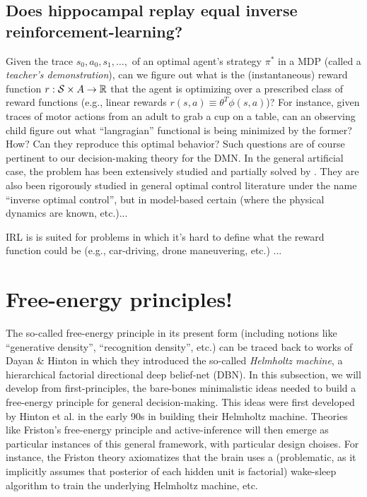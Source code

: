 \documentclass[10pt,letterpaper]{article}
\begin{document}
\subsection{Does hippocampal replay equal inverse reinforcement-learning?}
  Given the trace $s_0,a_0,s_1,\ldots,$ of an optimal agent's strategy $\pi^*$ in
  a MDP (called a \textit{teacher's demonstration}), can we figure out what is the
  (instantaneous) reward function $r: \mathcal S \times \mathcal \mathcal A
  \rightarrow \mathbb R$ that the agent is optimizing over a prescribed class of reward functions
  (e.g., linear rewards $r(s,a) \equiv \theta^T\phi(s,a)$)?
  For instance, given traces of motor actions from an adult to grab a cup on a table,
  can an observing child figure out what ``langragian'' functional is being minimized by the former?
  How? Can they reproduce this optimal behavior?
Such questions are of course pertinent to our decision-making theory for the DMN.
In the general artificial case, the problem has been extensively studied and partially solved by
\citep{abbeel2004}. They are also been rigorously studied in general optimal control literature under the name
``inverse optimal control'', but in model-based certain (where the physical dynamics are known, etc.)...

IRL is is suited for problems in which it's hard to define what the reward function could be
(e.g.,  car-driving, drone maneuvering, etc.) ...

\section{Free-energy principles!}
The so-called free-energy principle in its present form (including notions like ``generative density'', ``recognition density'', etc.) can be traced back to works of Dayan \& Hinton \citep{dayan1995helmholtz} in which they introduced the so-called \textit{Helmholtz machine}, a hierarchical factorial directional deep belief-net (DBN).
In this subsection, we will develop from first-principles, the bare-bones minimalistic ideas needed to build a free-energy principle for general decision-making. This ideas were first developed by Hinton et al. in the early 90s in building their Helmholtz machine. Theories like Friston's free-energy principle and active-inference will then emerge as particular instances of this general framework, with particular design choises. For instance, the Friston theory axiomatizes that the brain uses a (problematic, as it implicitly assumes that posterior of each hidden unit is factorial) wake-sleep algorithm to train the underlying Helmholtz machine, etc.
\end{document}
